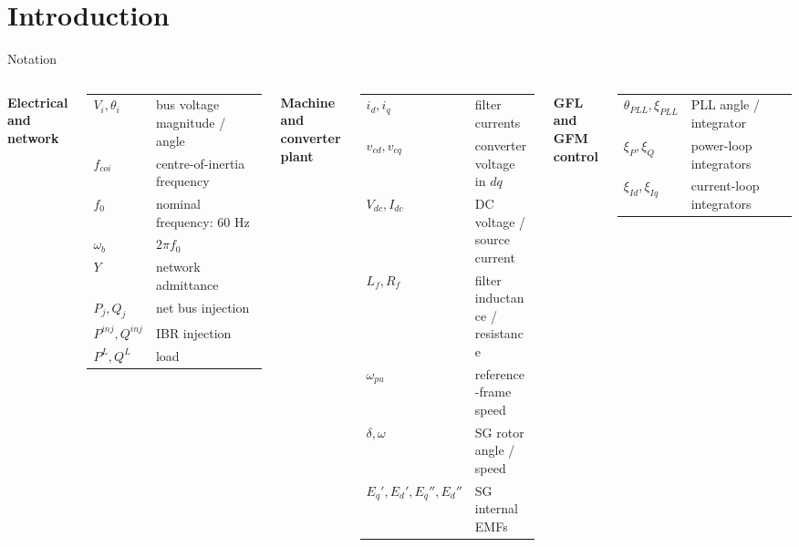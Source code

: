\documentclass{beamer}
\begin{document}
\section{Introduction}
\begin{frame}{Notation}
\fontsize{6}{6}\selectfont
\renewcommand{\arraystretch}{1.08}\setlength{\tabcolsep}{3pt}
\begin{columns}[t,onlytextwidth]
\textbf{Electrical and network}\par\smallskip
\begin{tabular}{@{}p{1.65cm}>{\raggedright\arraybackslash}p{3.25cm}@{}}
$V_i,\theta_i$ & bus voltage magnitude / angle\\
$f_{coi}$ & centre-of-inertia frequency\\
$f_0$ & nominal frequency: 60 Hz\\
$\omega_b$ & $2\pi f_0$\\
$Y$ & network admittance\\
$P_j,Q_j$ & net bus injection\\
$P^{inj},Q^{inj}$ & IBR injection\\
$P^L,Q^L$ & load\\
\end{tabular}\par\medskip
\textbf{Machine and converter plant}\par\smallskip
\begin{tabular}{@{}p{1.65cm}>{\raggedright\arraybackslash}p{3.25cm}@{}}
$i_d,i_q$ & filter currents\\
$v_{cd},v_{cq}$ & converter voltage in $dq$\\
$V_{dc},I_{dc}$ & DC voltage / source current\\
$L_f,R_f$ & filter inductance / resistance\\
$\omega_{pu}$ & reference-frame speed\\
$\delta,\omega$ & SG rotor angle / speed\\
$E_q',E_d',E_q'',E_d''$ & SG internal EMFs\\
\end{tabular}\par\medskip
{}
\textbf{GFL and GFM control}\par\smallskip
\begin{tabular}{@{}p{1.65cm}>{\raggedright\arraybackslash}p{3.25cm}@{}}
$\theta_{PLL},\xi_{PLL}$ & PLL angle / integrator\\
$\xi_P,\xi_Q$ & power-loop integrators\\
$\xi_{Id},\xi_{Iq}$ & current-loop integrators\\

\end{tabular}
\end{columns}
\end{frame}
\end{document}
